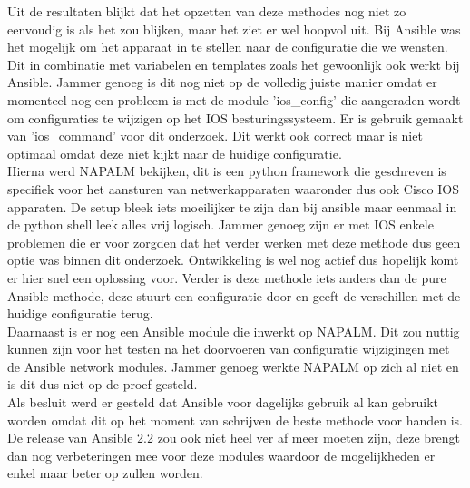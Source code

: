 Uit de resultaten blijkt dat het opzetten van deze methodes nog niet zo eenvoudig is als het zou blijken, maar het ziet er wel hoopvol uit. Bij Ansible was het mogelijk om het apparaat in te stellen naar de configuratie die we wensten. Dit in combinatie met variabelen en templates zoals het gewoonlijk ook werkt bij Ansible. Jammer genoeg is dit nog niet op de volledig juiste manier omdat er momenteel nog een probleem is met de module 'ios\_config' die aangeraden wordt om configuraties te wijzigen op het IOS besturingssysteem. Er is gebruik gemaakt van 'ios\_command' voor dit onderzoek. Dit werkt ook correct maar is niet optimaal omdat deze niet kijkt naar de huidige configuratie.
\\

Hierna werd NAPALM bekijken, dit is een python framework die geschreven is specifiek voor het aansturen van netwerkapparaten waaronder dus ook Cisco IOS apparaten. De setup bleek iets moeilijker te zijn dan bij ansible maar eenmaal in de python shell leek alles vrij logisch. Jammer genoeg zijn er met IOS enkele problemen die er voor zorgden dat het verder werken met deze methode dus geen optie was binnen dit onderzoek. Ontwikkeling is wel nog actief dus hopelijk komt er hier snel een oplossing voor. Verder is deze methode iets anders dan de pure Ansible methode, deze stuurt een configuratie door en geeft de verschillen met de huidige configuratie terug. 
\\
Daarnaast is er nog een Ansible module die inwerkt op NAPALM. Dit zou nuttig kunnen zijn voor het testen na het doorvoeren van configuratie wijzigingen met de Ansible network modules. Jammer genoeg werkte NAPALM op zich al niet en is dit dus niet op de proef gesteld.
\\

Als besluit werd er gesteld dat Ansible voor dagelijks gebruik al kan gebruikt worden omdat dit op het moment van schrijven de beste methode voor handen is. De release van Ansible 2.2 zou ook niet heel ver af meer moeten zijn, deze brengt dan nog verbeteringen mee voor deze modules waardoor de mogelijkheden er enkel maar beter op zullen worden.